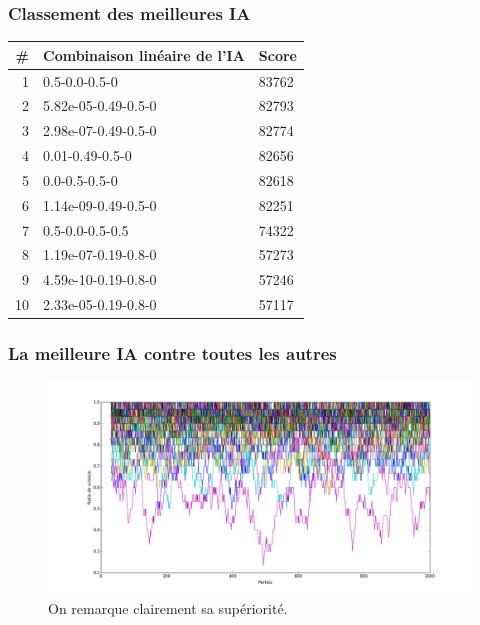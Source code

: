 \documentclass{beamer}
\begin{document}
\begin{frame}
  \frametitle{Classement des meilleures IA}
  \begin{center}
    \begin{tabular}{| r | l | l |}
      \hline
      \# & Combinaison linéaire de l'IA                          & Score \\
      \hline
      1  & 0.5-0.0-0.5-0                                         & 83762 \\
      2  & 5.82e-05-0.49-0.5-0                & 82793 \\
      3  & 2.98e-07-0.49-0.5-0                & 82774 \\
      4  & 0.01-0.49-0.5-0                 & 82656 \\
      5  & 0.0-0.5-0.5-0                                         & 82618 \\
      6  & 1.14e-09-0.49-0.5-0                & 82251 \\
      7  & 0.5-0.0-0.5-0.5                                       & 74322 \\
      8  & 1.19e-07-0.19-0.8-0                & 57273 \\
      9  & 4.59e-10-0.19-0.8-0                 & 57246 \\
      10 & 2.33e-05-0.19-0.8-0                & 57117 \\
      \hline
    \end{tabular}
  \end{center}
\end{frame}

\begin{frame}
  \frametitle{La meilleure IA contre toutes les autres}
  \begin{figure}
    \includegraphics[scale=0.265]{plot/best.png}
    \caption{
      \label{fig_best} On remarque clairement sa supériorité.
    }
  \end{figure}
\end{frame}
\end{document}

